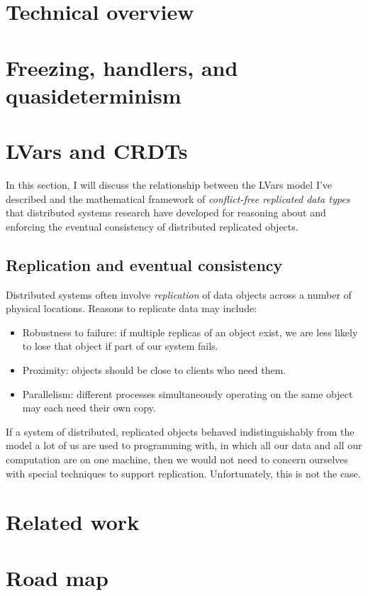 \documentclass{article}
\begin{document}

\section{Technical overview}

\section{Freezing, handlers, and quasideterminism}

\section{LVars and CRDTs}

In this section, I will discuss the relationship between the LVars
model I've described and the mathematical framework of
\emph{conflict-free replicated data types} that distributed systems
research have developed for reasoning about and enforcing the eventual
consistency of distributed replicated objects.

\subsection{Replication and eventual consistency}

Distributed systems often involve \emph{replication} of data objects
across a number of physical locations.  Reasons to replicate data may
include:
\begin{itemize}
\item Robustness to failure: if multiple replicas of an object exist,
  we are less likely to lose that object if part of our system fails.

\item Proximity: objects should be close to clients who need them.

\item Parallelism: different processes simultaneously operating on the
  same object may each need their own copy. 
\end{itemize}
If a system of distributed, replicated objects behaved
indistinguishably from the model a lot of us are used to programming
with, in which all our data and all our computation are on one
machine, then we would not need to concern ourselves with special
techniques to support replication.    Unfortunately, this is
not the case.

\section{Related work}

\section{Road map}



\end{document}
